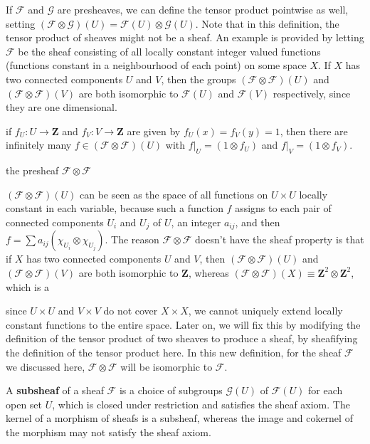 \begin{example}
    If $\mathcal{F}$ and $\mathcal{G}$ are presheaves, we can define the tensor product pointwise as well, setting $(\mathcal{F} \otimes \mathcal{G})(U) = \mathcal{F}(U) \otimes \mathcal{G}(U)$. Note that in this definition, the tensor product of sheaves might not be a sheaf. An example is provided by letting $\mathcal{F}$ be the sheaf consisting of all locally constant integer valued functions (functions constant in a neighbourhood of each point) on some space $X$. If $X$ has two connected components $U$ and $V$, then the groups $(\mathcal{F} \otimes \mathcal{F})(U)$ and $(\mathcal{F} \otimes \mathcal{F})(V)$ are both isomorphic to $\mathcal{F}(U)$ and $\mathcal{F}(V)$ respectively, since they are one dimensional.

    if $f_U: U \to \mathbf{Z}$ and $f_V: V \to \mathbf{Z}$ are given by $f_U(x) = f_V(y) = 1$, then there are infinitely many $f \in (\mathcal{F} \otimes \mathcal{F})(U)$ with $f|_U = (1 \otimes f_U)$ and $f|_V = (1 \otimes f_V)$.

    the presheaf $\mathcal{F} \otimes \mathcal{F}$

    $(\mathcal{F} \otimes \mathcal{F})(U)$ can be seen as the space of all functions on $U \times U$ locally constant in each variable, because such a function $f$ assigns to each pair of connected components $U_i$ and $U_j$ of $U$, an integer $a_{ij}$, and then $f = \sum a_{ij} (\chi_{U_i} \otimes \chi_{U_j})$. The reason $\mathcal{F} \otimes \mathcal{F}$ doesn't have the sheaf property is that if $X$ has two connected components $U$ and $V$, then $(\mathcal{F} \otimes \mathcal{F})(U)$ and $(\mathcal{F} \otimes \mathcal{F})(V)$ are both isomorphic to $\mathbf{Z}$, whereas $(\mathcal{F} \otimes \mathcal{F})(X) \equiv \mathbf{Z}^2 \otimes \mathbf{Z}^2$, which is a 

    since $U \times U$ and $V \times V$ do not cover $X \times X$, we cannot uniquely extend locally constant functions to the entire space. Later on, we will fix this by modifying the definition of the tensor product of two sheaves to produce a sheaf, by sheafifying the definition of the tensor product here. In this new definition, for the sheaf $\mathcal{F}$ we discussed here, $\mathcal{F} \otimes \mathcal{F}$ will be isomorphic to $\mathcal{F}$.
\end{example}

A {\bf subsheaf} of a sheaf $\mathcal{F}$ is a choice of subgroups $\mathcal{G}(U)$ of $\mathcal{F}(U)$ for each open set $U$, which is closed under restriction and satisfies the sheaf axiom. The kernel of a morphism of sheafs is a subsheaf, whereas the image and cokernel of the morphism may not satisfy the sheaf axiom.

